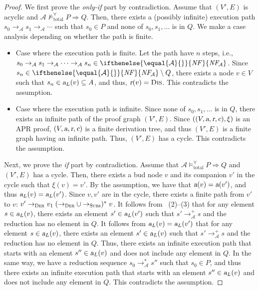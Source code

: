 \documentclass[10pt,a4paper]{article}
\newcommand{\bfnum}[1]{(#1)}
\def\cA{\mathcal{A}}
\newcommand{\NF}[1][]{\ifthenelse{\equal{#1}{}}{\mathit{NF}}{\mathit{NF\!}_{#1}}}
\newcommand{\ReachPred}[2]{#1 \Rightarrow #2}
\newcommand{\Valid}[3]{#2 \mathrel{\mathrel{\models^\forall_{\mathrm{#1}}}} #3}
\newcommand{\NotValid}[3]{#2 \mathrel{\mathrel{\not\models^\forall_{\mathrm{#1}}}} #3}
\newcommand{\TotallyValid}[2][\cA]{\Valid{total}{#1}{#2}}
\newcommand{\NotTotallyValid}[2][\cA]{\NotValid{total}{#1}{#2}}
\newcommand{\RuleName}[1]{{\rm \textsc{#1}}}
\newcommand{\varsl}[1]{\mbox{\sl #1}}
\newcommand{\Path}[1]{\to_{\mbox{\scriptsize \RuleName{#1}}}}
\newcommand{\toDer}{\Path{Der}}
\newcommand{\toSubs}{\Path{Subs}}
\begin{document}
\ThmTotalValidityProof*
\begin{proof}
	We first prove the \textit{only-if} part by contradiction.
	Assume that $(V',E)$ is acyclic and $\NotTotallyValid{\ReachPred{P}{Q}}$.
	Then, there exists a (possibly infinite) execution path $s_0 \to_\cA s_1 \to_\cA \cdots$ such that $s_0 \in P$ and none of $s_0,s_1,\ldots$ is in $Q$.
	We make a case analysis depending on whether the path is finite.
	\begin{itemize}
		\item Case where the execution path is finite.
		      Let the path have $n$ steps, i.e.,
		      $s_0 \to_\cA s_1 \to_\cA \cdots \to_\cA s_n \in \NF[\cA]$.
		      Since $s_n \in \NF[\cA] \setminus Q$,
		      there exists a node $v \in V$ such that
		      $s_n \in \varsl{a}_L(v) \subseteq A$, and thus, $\varsl{r}(v) = \RuleName{Dis}$.
		      This contradicts the assumption.


		\item Case where the execution path is infinite.
		      Since none of $s_0,s_1,\ldots$ is in $Q$,
		      there exists an infinite path of the proof graph $(V',E)$.
		      Since $((V,\varsl{a},\varsl{r},\varsl{c}),\xi)$ is an APR proof, $(V,\varsl{a},\varsl{r},\varsl{c})$ is a finite derivation tree, and thus $(V',E)$ is a finite graph having an infinite path.
		      Thus, $(V',E)$ has a cycle.
		      This contradicts the assumption.
	\end{itemize}

	Next, we prove the \textit{if} part by contradiction.
	Assume that
	$\TotallyValid{\ReachPred{P}{Q}}$
	and
	$(V',E)$ has a cycle.
	Then, there exists a bud node $v$ and its companion $v'$ in the cycle such that $\xi(v) = v'$.
	By the assumption, we have that $\varsl{a}(v)=\varsl{a}(v')$, and thus $\varsl{a}_L(v) = \varsl{a}_L(v')$. Since $v,v'$ are in the cycle, there exists a finite path from $v'$ to $v$:
	$v' \mathrel{\toDer} v_1 \mathrel{({\toDer} \cup {\toSubs})^*} v$.
	It follows from ~\bfnum{2}--\bfnum{3} that
	for any element $s \in \varsl{a}_L(v)$,
	there exists an element $s' \in \varsl{a}_L(v')$
	such that $s' \to_\cA^+ s$ and the reduction has no element in $Q$.
	It follows from $\varsl{a}_L(v) = \varsl{a}_L(v')$ that
	for any element $s \in \varsl{a}_L(v)$,
	there exists an element $s' \in \varsl{a}_L(v)$
	such that $s' \to_\cA^+ s$ and the reduction has no element in $Q$.
	Thus, there exists an infinite execution path that starts with an element $s'' \in \varsl{a}_L(v)$ and does not include any element in $Q$.
	In the same way, we have a reduction sequence $s_0 \to_\cA^* s''$ such that $s_0 \in P$, and thus there exists an infinite execution path that starts with an element $s'' \in \varsl{a}_L(v)$ and does not include any element in $Q$.
	This contradicts the assumption.
\end{proof}



\end{document}
